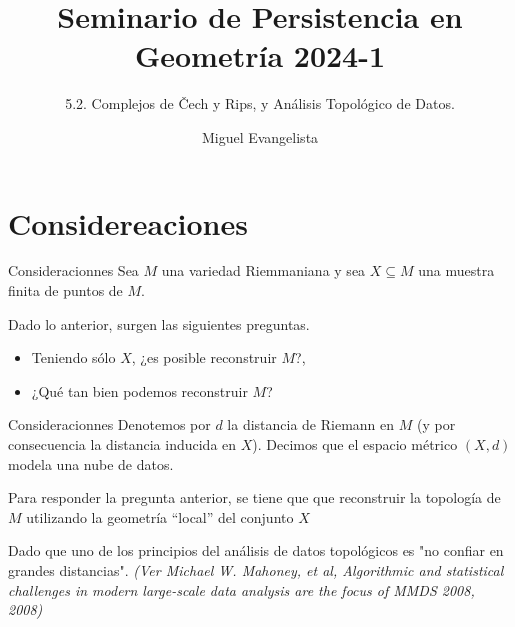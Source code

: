 \documentclass{beamer}
\title{Seminario de Persistencia en Geometría 2024-1}
\subtitle{5.2. Complejos de \v{C}ech y Rips, y Análisis Topológico de Datos.} %
\author{Miguel Evangelista}
\begin{document}
\frenchspacing


  \frame{\maketitle}


\section{Considereaciones}


\begin{frame}{Consideracionnes}
    Sea $M$ una variedad Riemmaniana y sea $X\subseteq M$ una muestra finita de puntos de $M$.
    \newline
    \pause
    
    Dado lo anterior, surgen las siguientes preguntas.
    \begin{itemize}
        \item Teniendo sólo $X$, ¿es posible reconstruir $M$?, 
        \item ¿Qué tan bien podemos reconstruir $M$?
    \end{itemize} 
\end{frame}

\begin{frame}{Consideracionnes}
    Denotemos por $d$ la distancia de Riemann en $M$ (y por consecuencia la distancia inducida en $X$). Decimos que el espacio métrico $(X,d)$ modela una nube de datos.
    \newline
    \pause

    Para responder la pregunta anterior, se tiene que que reconstruir la topología de $M$ utilizando la geometría “local” del conjunto $X$
    \newline
    \pause
    
    Dado que uno de los principios del análisis de datos topológicos es "no confiar en grandes distancias". \textit{(Ver Michael W. Mahoney, et al, Algorithmic and statistical challenges in modern large-scale data analysis are the focus of MMDS 2008, 2008)}
\end{frame}
\end{document}
